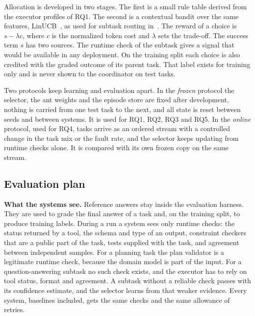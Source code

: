\documentclass[11pt,a4paper]{article}
\newcommand{\runin}[1]{\textbf{#1}\quad}
\begin{document}
Allocation is developed in two stages. The first is a small rule table derived from the executor profiles
of RQ1. The second is a contextual bandit over the same features, LinUCB~\cite{li2010linucb}, as used for
subtask routing in~\cite{guan2026symphony}. The reward of a choice is $s-\lambda c$, where $c$ is the
normalized token cost and $\lambda$ sets the trade-off. The success term $s$ has two sources. The runtime
check of the subtask gives a signal that would be available in any deployment. On the training split each
choice is also credited with the graded outcome of its parent task. That label exists for training only and
is never shown to the coordinator on test tasks.

Two protocols keep learning and evaluation apart. In the \emph{frozen} protocol the selector, the ant
weights and the episode store are fixed after development, nothing is carried from one test task to the
next, and all state is reset between seeds and between systems. It is used for RQ1, RQ2, RQ3 and RQ5. In
the \emph{online} protocol, used for RQ4, tasks arrive as an ordered stream with a controlled change in the
task mix or the fault rate, and the selector keeps updating from runtime checks alone. It is compared with
its own frozen copy on the same stream.

\subsection{Evaluation plan}
\label{sec:eval}

\runin{What the systems see.}
Reference answers stay inside the evaluation harness. They are used to grade the final answer of a task
and, on the training split, to produce training labels. During a run a system sees only runtime checks:
the status returned by a tool, the schema and type of an output, constraint checkers that are a public
part of the task, tests supplied with the task, and agreement between independent samples. For a planning
task the plan validator is a legitimate runtime check, because the domain model is part of the input. For
a question-answering subtask no such check exists, and the executor has to rely on tool status, format and
agreement. A subtask without a reliable check passes with its confidence estimate, and the selector learns
from that weaker evidence. Every system, baselines included, gets the same checks and the same allowance of
retries.
\end{document}
